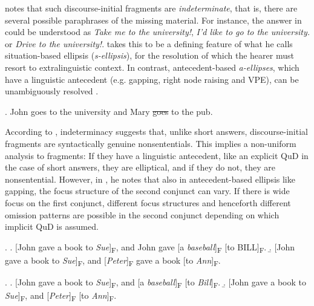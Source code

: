 \citet[1852]{reich2011} notes that such discourse-initial fragments are \textit{indeterminate}, that is, there are several possible paraphrases of the missing material. For instance, the answer in \LLast[a] could be understood as \textit{Take me to the university!}, \textit{I'd like to go to the university.} or \textit{Drive to the university!}. \citeauthor{reich2011} takes this to be a defining feature of what he calls situation-based ellipsis (\textit{s-ellipsis}), for the resolution of which the hearer must resort to extralinguistic context. In contrast, antecedent-based \textit{a-ellipses}, which have a linguistic antecedent (e.g. gapping, right node raising and VPE), can be unambiguously resolved \Next.

\ex. John goes to the university and Mary \sout{goes} to the pub.

According to \citet[1852]{reich2011}, indeterminacy suggests that, unlike short answers, discourse-initial fragments are syntactically genuine nonsententials. This implies a non-uniform analysis to fragments: If they have a linguistic antecedent, like an explicit QuD in the case of short answers, they are elliptical, and if they do not, they are nonsentential. However, in \citet{reich2007}, he notes that also in antecedent-based ellipsis like gapping, the focus structure of the second conjunct can vary. If there is wide focus on the first conjunct, different focus structures \Next and henceforth different omission patterns \NNext are possible in the second conjunct depending on which implicit QuD is assumed.

\ex. \a. [John gave a book to \textit{Sue}]\textsubscript{F}, and John gave [a \textit{baseball}]\textsubscript{F} [to BILL]\textsubscript{F}. 
    \b. [John gave a book to \textit{Sue}]\textsubscript{F}, and [\textit{Peter}]\textsubscript{F} gave a book [to \textit{Ann}]\textsubscript{F}.\\ \mbox{}\hfill\hfill\citep[478]{reich2007}

\ex. \a. [John gave a book to \textit{Sue}]\textsubscript{F}, and [a \textit{baseball}]\textsubscript{F} [to \textit{Bill}]\textsubscript{F}. 
    \b. [John gave a book to \textit{Sue}]\textsubscript{F}, and [\textit{Peter}]\textsubscript{F} [to \textit{Ann}]\textsubscript{F}.\\ \mbox{}\hfill\hfill\citep[478]{reich2007}
    

